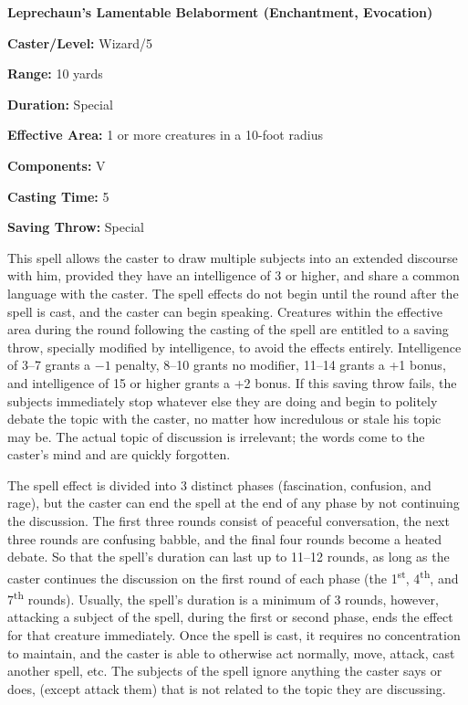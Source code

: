\begin{multicols}{2}
\vspace{1em}

\noindent
\begin{minipage}{\columnwidth}

\noindent \textbf{Leprechaun's Lamentable Belaborment (Enchantment, Evocation)}

\noindent \textbf{Caster/Level:} Wizard/5

\noindent \textbf{Range:} 10 yards

\noindent \textbf{Duration:} Special

\noindent \textbf{Effective Area:} 1 or more creatures in a 10-foot radius

\noindent \textbf{Components:} V

\noindent \textbf{Casting Time:} 5

\noindent \textbf{Saving Throw:} Special

\end{minipage}

This spell allows the caster to draw multiple subjects into an extended discourse with him, provided they have an intelligence of 3 or higher, and share a common language with the caster.  The spell effects do not begin until the round after the spell is cast, and the caster can begin speaking.  Creatures within the effective area during the round following the casting of the spell are entitled to a saving throw, specially modified by intelligence, to avoid the effects entirely.  Intelligence of 3--7 grants a $-1$ penalty, 8--10 grants no modifier, 11--14 grants a +1 bonus, and intelligence of 15 or higher grants a +2 bonus.  If this saving throw fails, the subjects immediately stop whatever else they are doing and begin to politely debate the topic with the caster, no matter how incredulous or stale his topic may be.  The actual topic of discussion is irrelevant; the words come to the caster's mind and are quickly forgotten.

The spell effect is divided into 3 distinct phases (fascination, confusion, and rage), but the caster can end the spell at the end of any phase by not continuing the discussion.  The first three rounds consist of peaceful conversation, the next three rounds are confusing babble, and the final four rounds become a heated debate.  So that the spell's duration can last up to 11--12 rounds, as long as the caster continues the discussion on the first round of each phase (the 1\textsuperscript{st}, 4\textsuperscript{th}, and 7\textsuperscript{th} rounds).  Usually, the spell's duration is a minimum of 3 rounds, however, attacking a subject of the spell, during the first or second phase, ends the effect for that creature immediately.  Once the spell is cast, it requires no concentration to maintain, and the caster is able to otherwise act normally, move, attack, cast another spell, etc.  The subjects of the spell ignore anything the caster says or does, (except attack them) that is not related to the topic they are discussing.


\end{multicols}
